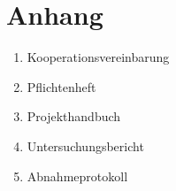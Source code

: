 \chapter{Anhang}
\begin{enumerate}
	\item Kooperationsvereinbarung
	\item Pflichtenheft
	\item Projekthandbuch
	\item Untersuchungsbericht
	\item Abnahmeprotokoll
\end{enumerate}




